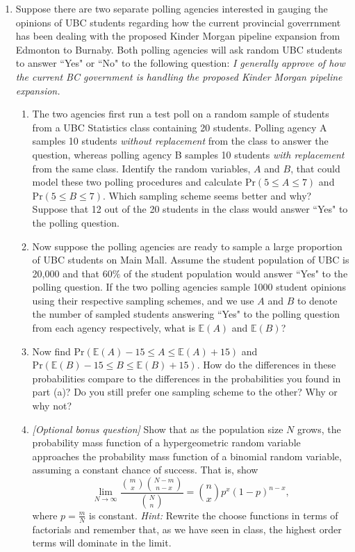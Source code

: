 \documentclass[11pt]{article}
\newcommand{\pr}{\text{Pr}}
\newcommand{\e}{\mathbb{E}}
\begin{document}
\begin{enumerate}[label=\textbf{Question \arabic*:},start=1]
\item 
Suppose there are two separate polling agencies interested in gauging the opinions of UBC students regarding how the current provincial goverrnment has been dealing with the proposed Kinder Morgan pipeline expansion from Edmonton to Burnaby. Both polling agencies will ask random UBC students to answer ``Yes" or ``No" to the following question: {\em I generally approve of how the current BC government is handling the proposed Kinder Morgan pipeline expansion.}

\begin{enumerate}
  \item The two agencies first run a test poll on a random sample of students from a UBC Statistics class containing 20 students. Polling agency A samples 10 students {\em without replacement} from the class to answer the question, whereas polling agency B samples 10 students {\em with replacement} from the same class. Identify the random variables, $A$ and $B$, that could model these two polling procedures and calculate $\pr(5\leq A\leq 7)$ and $\pr(5\leq B\leq 7)$. Which sampling scheme seems better and why? Suppose that 12 out of the 20 students in the class would answer ``Yes" to the polling question.\\

  \item Now suppose the polling agencies are ready to sample a large proportion of UBC students on Main Mall. Assume the student population of UBC is 20,000 and that $60\%$ of the student population would answer ``Yes" to the polling question. If the two polling agencies sample 1000 student opinions using their respective sampling schemes, and we use $A$ and $B$ to denote the number of sampled students answering ``Yes" to the polling question from each agency respectively, what is $\e(A)$ and $\e(B)$?\\

  \item Now find $\pr(\e(A) - 15 \leq A \leq \e(A) + 15)$ and $\pr(\e(B) - 15 \leq B \leq \e(B) + 15)$. How do the differences in these probabilities compare to the differences in the probabilities you found in part (a)? Do you still prefer one sampling scheme to the other? Why or why not?\\

  \item {\em [Optional bonus question]} Show that as the population size $N$ grows, the probability mass function of a hypergeometric random variable approaches the probability mass function of a binomial random variable, assuming a constant chance of success. That is, show $$\lim_{N\rightarrow\infty} \frac { {m \choose x}{N-m \choose n-x}}{ {N\choose n}} = {n\choose x} p^x (1-p)^{n-x},$$ where $p = \frac mN$ is constant. {\em Hint:} Rewrite the choose functions in terms of factorials and remember that, as we have seen in class, the highest order terms will dominate in the limit.
\end{enumerate}





\end{enumerate}
\end{document}
